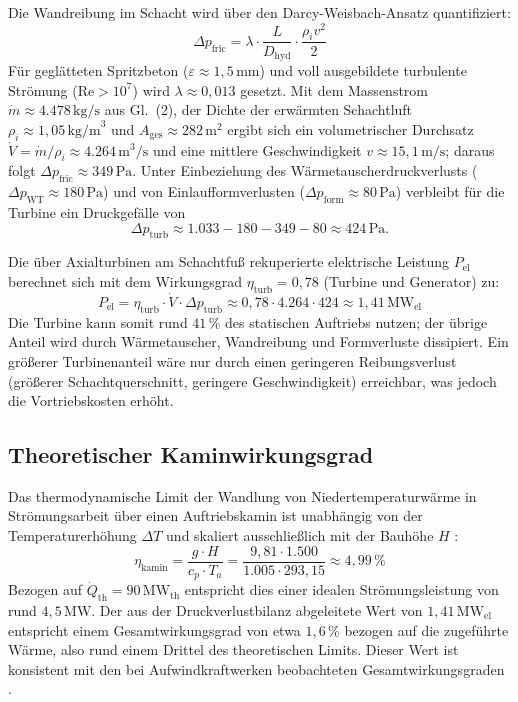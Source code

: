 \documentclass[journal]{IEEEtran}
\begin{document}
Die Wandreibung im Schacht wird über den Darcy-Weisbach-Ansatz quantifiziert:
\begin{equation}
\Delta p_{\text{fric}} = \lambda \cdot \frac{L}{D_{\text{hyd}}} \cdot \frac{\rho_i v^2}{2}
\end{equation}
Für geglätteten Spritzbeton ($\varepsilon \approx 1{,}5\,\text{mm}$) und voll ausgebildete turbulente Strömung ($\text{Re} > 10^7$) wird $\lambda \approx 0{,}013$ gesetzt. Mit dem Massenstrom $\dot{m} \approx 4.478\,\text{kg/s}$ aus Gl.~(2), der Dichte der erwärmten Schachtluft $\rho_i \approx 1{,}05\,\text{kg/m}^3$ und $A_{\text{ges}} \approx 282\,\text{m}^2$ ergibt sich ein volumetrischer Durchsatz $\dot{V} = \dot{m}/\rho_i \approx 4.264\,\text{m}^3/\text{s}$ und eine mittlere Geschwindigkeit $v \approx 15{,}1\,\text{m/s}$; daraus folgt $\Delta p_{\text{fric}} \approx 349\,\text{Pa}$. Unter Einbeziehung des Wärmetauscherdruckverlusts ($\Delta p_{\text{WT}} \approx 180\,\text{Pa}$) und von Einlaufformverlusten ($\Delta p_{\text{form}} \approx 80\,\text{Pa}$) verbleibt für die Turbine ein Druckgefälle von
\begin{equation}
\Delta p_{\text{turb}} \approx 1.033 - 180 - 349 - 80 \approx 424\,\text{Pa}.
\end{equation}

Die über Axialturbinen am Schachtfuß rekuperierte elektrische Leistung $P_{\text{el}}$ berechnet sich mit dem Wirkungsgrad $\eta_{\text{turb}} = 0{,}78$ (Turbine und Generator) zu:
\begin{equation}
P_{\text{el}} = \eta_{\text{turb}} \cdot \dot{V} \cdot \Delta p_{\text{turb}} \approx 0{,}78 \cdot 4.264 \cdot 424 \approx 1{,}41\,\text{MW}_{\text{el}}
\end{equation}
Die Turbine kann somit rund $41\,\%$ des statischen Auftriebs nutzen; der übrige Anteil wird durch Wärmetauscher, Wandreibung und Formverluste dissipiert. Ein größerer Turbinenanteil wäre nur durch einen geringeren Reibungsverlust (größerer Schachtquerschnitt, geringere Geschwindigkeit) erreichbar, was jedoch die Vortriebskosten erhöht.

\subsection{Theoretischer Kaminwirkungsgrad}
Das thermodynamische Limit der Wandlung von Niedertemperaturwärme in Strömungsarbeit über einen Auftriebskamin ist unabhängig von der Temperaturerhöhung $\Delta T$ und skaliert ausschließlich mit der Bauhöhe $H$ \cite{haaf1983}:
\begin{equation}
\eta_{\text{kamin}} = \frac{g \cdot H}{c_p \cdot T_a} = \frac{9{,}81 \cdot 1.500}{1.005 \cdot 293{,}15} \approx 4{,}99\,\%
\end{equation}
Bezogen auf $\dot{Q}_{\text{th}} = 90\,\text{MW}_{\text{th}}$ entspricht dies einer idealen Strömungsleistung von rund $4{,}5\,\text{MW}$. Der aus der Druckverlustbilanz abgeleitete Wert von $1{,}41\,\text{MW}_{\text{el}}$ entspricht einem Gesamtwirkungsgrad von etwa $1{,}6\,\%$ bezogen auf die zugeführte Wärme, also rund einem Drittel des theoretischen Limits. Dieser Wert ist konsistent mit den bei Aufwindkraftwerken beobachteten Gesamtwirkungsgraden \cite{haaf1983, ho2021}.
\end{document}
